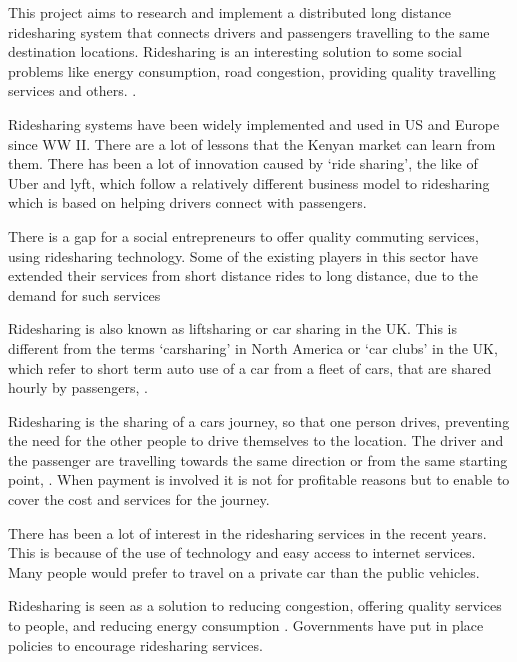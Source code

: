 
This project aims to research and implement a distributed long distance ridesharing system that connects drivers and passengers travelling to the same destination locations. Ridesharing is an interesting solution to some social problems like energy consumption, road congestion, providing quality travelling services and others. \citep{noland2006}.

Ridesharing systems have been widely implemented and used in US and Europe since WW II\@. There are a lot of lessons that the Kenyan market can learn from them. There has been a lot of innovation caused by `ride sharing', the like of Uber and lyft, which follow a relatively different business model to ridesharing which is based on helping drivers connect with passengers.

There is a gap for a social entrepreneurs to offer quality commuting services, using ridesharing technology. Some of the existing players in this sector have extended their services from short distance rides to long distance, due to the demand for such services \citep{swvlalvinwanjala}

Ridesharing is also known as liftsharing or car sharing in the UK\@. This is different from the terms `carsharing' in North America or `car clubs' in the UK, which refer to short term auto use of a car from a fleet of cars, that are shared hourly by passengers, \citep{shaheen2009}.

Ridesharing is the sharing of a cars journey, so that one person drives, preventing the need for the other people to drive themselves to the location. The driver and the passenger are travelling towards the same direction or from the same starting point, \citep{chan2012}. When payment is involved it is not for profitable reasons but to enable to cover the cost and services for the journey.

There has been a lot of interest in the ridesharing services in the recent years. This is because of the use of technology and easy access to internet services. Many people would prefer to travel on a private car than the public vehicles.

Ridesharing is seen as a solution to reducing congestion,  offering quality services to people, and reducing energy consumption \citep{noland2006}. Governments have put in place policies to encourage ridesharing services.